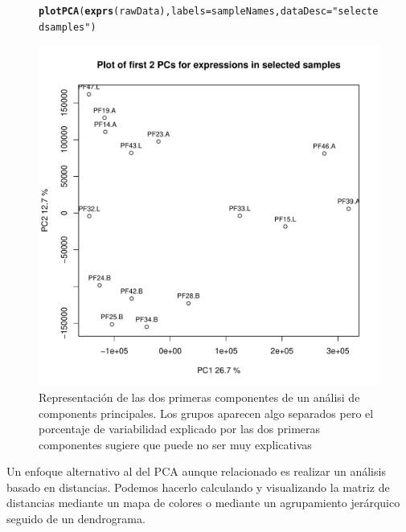 \documentclass[a4paper]{article}\usepackage[]{graphicx}\usepackage[]{color}
\makeatletter
\def\maxwidth{ %
  \ifdim\Gin@nat@width>\linewidth
    \linewidth
  \else
    \Gin@nat@width
  \fi
}
\newcommand{\hlstr}[1]{\textcolor[rgb]{0.192,0.494,0.8}{#1}}%
\newcommand{\hlstd}[1]{\textcolor[rgb]{0.345,0.345,0.345}{#1}}%
\newcommand{\hlkwc}[1]{\textcolor[rgb]{0.333,0.667,0.333}{#1}}%
\newcommand{\hlkwd}[1]{\textcolor[rgb]{0.737,0.353,0.396}{\textbf{#1}}}%
\newenvironment{kframe}{%
 \def\at@end@of@kframe{}%
 \ifinner\ifhmode%
  \def\at@end@of@kframe{\end{minipage}}%
  \begin{minipage}{\columnwidth}%
 \fi\fi%
 \def\FrameCommand##1{\hskip\@totalleftmargin \hskip-\fboxsep
 \colorbox{shadecolor}{##1}\hskip-\fboxsep
     \hskip-\linewidth \hskip-\@totalleftmargin \hskip\columnwidth}%
 \MakeFramed {\advance\hsize-\width
   \@totalleftmargin\z@ \linewidth\hsize
   \@setminipage}}%
 {\par\unskip\endMakeFramed%
 \at@end@of@kframe}
\newenvironment{knitrout}{}{} %
\makeatother
\begin{document}
\begin{figure}[htbp]
\centering
\begin{knitrout}
\color{fgcolor}\begin{kframe}
\begin{alltt}
\hlkwd{plotPCA}\hlstd{(}\hlkwd{exprs}\hlstd{(rawData),} \hlkwc{labels}\hlstd{=sampleNames,} \hlkwc{dataDesc}\hlstd{=}\hlstr{"selected samples"}\hlstd{)}
\end{alltt}
\end{kframe}
\includegraphics[width=\maxwidth]{images/graficplotPCA2D-1} 

\end{knitrout}
\caption{Representación de las dos primeras componentes de un análisi de components principales. Los grupos aparecen algo separados pero el porcentaje de variabilidad explicado por las dos primeras componentes sugiere que puede no ser muy explicativas}
\label{fig:PCA2D}
\end{figure}

Un enfoque alternativo al del PCA aunque relacionado es realizar un análisis basado en distancias. Podemos hacerlo calculando y visualizando la matriz de distancias mediante un mapa de colores o mediante un agrupamiento jerárquico seguido de un dendrograma.
\end{document}
